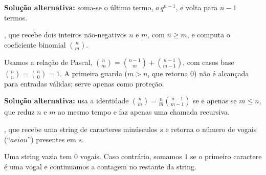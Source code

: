 {{\begin{Qlist}
\begin{solution}

        \textbf{Solução alternativa:} soma-se o último termo, $a\,q^{n-1}$, e volta para $n-1$ termos.

        \end{solution}

        \item[(k)] , que recebe dois inteiros não-negativos
            $n$ e $m$, com $n \geq m$, e computa o coeficiente binomial $\binom{n}{m}$.

        \begin{solution}
        Usamos a relação de Pascal, $\binom{n}{m}=\binom{n-1}{m}+\binom{n-1}{m-1}$, com
        casos base $\binom{n}{n}=\binom{n}{0}=1$. A primeira guarda ($m>n$, que retorna $0$)
        não é alcançada para entradas válidas; serve apenas como proteção.


        \textbf{Solução alternativa:} usa a identidade $\binom{n}{m}=\frac{n}{m}\binom{n-1}{m-1}$ se e apenas se $m\leq n$, que reduz $n$ e $m$ ao mesmo tempo e faz apenas uma chamada recursiva.

        \end{solution}

        \item[(l)] , que recebe uma string de caracteres
            minúsculos $s$ e retorna o número de vogais (``$aeiou$'') presentes em $s$.

        \begin{solution}
        Uma string vazia tem $0$ vogais. Caso contrário, somamos $1$ se o primeiro caractere é
        uma vogal e continuamos a contagem no restante da string.

        \end{solution}
    \end{Qlist}
} }


